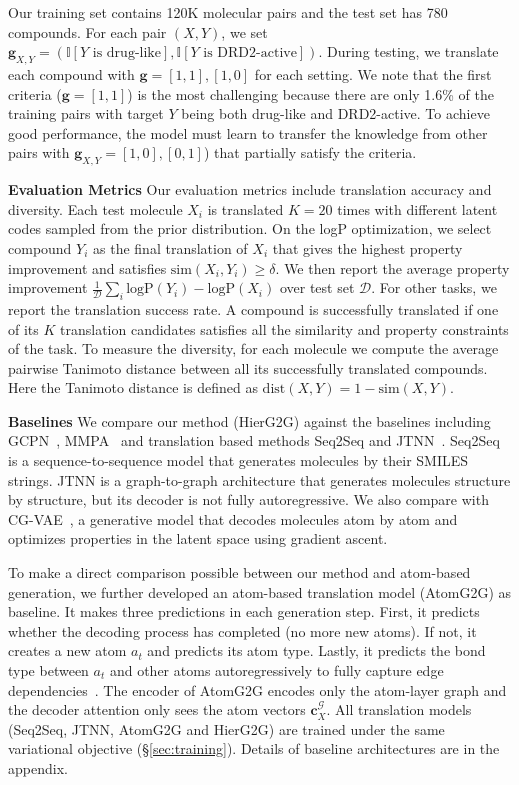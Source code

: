 \documentclass{article} \usepackage{iclr2020_conference,times}
\newcommand{\graph}{\mathcal{G}}
\def\vc{{\bm{c}}}
\def\vg{{\bm{g}}}
\def\gD{{\mathcal{D}}}
\begin{document}
Our training set contains 120K molecular pairs and the test set has 780 compounds. For each pair $(X,Y)$, we set $\vg_{X,Y}=\left(\mathbb{I}[Y \text{ is drug-like}], \mathbb{I}[Y \text{ is DRD2-active}]\right)$.
During testing, we translate each compound with $\vg=[1,1],[1,0]$ for each setting.
We note that the first criteria ($\vg=[1,1]$) is the most challenging because there are only 1.6\% of the training pairs with target $Y$ being both drug-like and DRD2-active.
To achieve good performance, the model must learn to transfer the knowledge from other pairs with $\vg_{X,Y}=[1,0],[0,1]$) that partially satisfy the criteria.

\textbf{Evaluation Metrics } Our evaluation metrics include translation accuracy and diversity. Each test molecule $X_i$ is translated $K=20$ times with different latent codes sampled from the prior distribution. On the logP optimization, we select compound $Y_i$ as the final translation of $X_i$ that gives the highest property improvement and satisfies $\mathrm{sim}(X_i,Y_i)\geq\delta$. We then report the average property improvement $\frac{1}{\gD}\sum_i\mathrm{logP}(Y_i)-\mathrm{logP}(X_i)$ over test set $\gD$. For other tasks, we report the translation success rate. A compound is successfully translated if one of its $K$ translation candidates satisfies all the similarity and property constraints of the task.
To measure the diversity, for each molecule we compute the average pairwise Tanimoto distance between all its successfully translated compounds. Here the Tanimoto distance is defined as $\mathrm{dist}(X,Y)=1-\mathrm{sim}(X,Y)$.

\textbf{Baselines } We compare our method (HierG2G) against the baselines including GCPN~\citep{you2018graph}, MMPA~\citep{dalke2018mmpdb} and translation based methods Seq2Seq and JTNN~\citep{jin2018learning}.
Seq2Seq is a sequence-to-sequence model that generates molecules by their SMILES strings. 
JTNN is a graph-to-graph architecture that generates molecules structure by structure, but its decoder is not fully autoregressive. 
We also compare with CG-VAE~\citep{liu2018constrained}, a generative model that decodes molecules atom by atom and optimizes properties in the latent space using gradient ascent.

To make a direct comparison possible between our method and atom-based generation, we further developed an atom-based translation model (AtomG2G) as baseline. 
It makes three predictions in each generation step. First, it predicts whether the decoding process has completed (no more new atoms). If not, it creates a new atom $a_t$ and predicts its atom type. Lastly, it predicts the bond type between $a_t$ and other atoms autoregressively to fully capture edge dependencies~\citep{you2018graphrnn}.
The encoder of AtomG2G encodes only the atom-layer graph and the decoder attention only sees the atom vectors $\vc_X^\graph$. All translation models (Seq2Seq, JTNN, AtomG2G and HierG2G) are trained under the same variational objective (\S\ref{sec:training}). Details of baseline architectures are in the appendix. 
\end{document}
